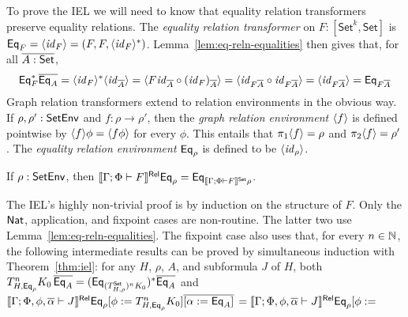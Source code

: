\documentclass[runningheads]{llncs}
\newcommand{\set}{\mathsf{Set}}
\renewcommand{\id}{\mathit{id}}
\renewcommand{\id}{\mathit{id}}
\begin{document}
To prove the IEL we will need to know that equality relation
transformers preserve equality relations. The {\em equality relation
  transformer} on $F : [\set^k,\set]$ is $\Eq_F = \graph{\id_{F}} =
(F, F, \graph{\id_{F}}^*)$. Lemma~\ref{lem:eq-reln-equalities} then
gives that, for all $\ol{A : \set}$,
\begin{equation*}\label{eq:eq-pres-eq}
\Eq^*_F \ol{\Eq_A}
= \graph{\id_F}^* \graph{\id_{\ol{A}}}
= \graph{F \id_{\ol{A}} \circ (\id_F)_{\ol{A}}}
= \graph{\id_{F\ol{A}} \circ \id_{F\ol{A}}}
= \graph{\id_{F\ol{A}}}
= \Eq_{F\ol{A}}
\end{equation*}
Graph relation transformers extend to relation environments in the
obvious way. If $\rho, \rho' : \mathsf{SetEnv}$ and $f : \rho \to \rho'$, then
the {\em graph relation environment} $\langle {f} \rangle$ is defined pointwise
by $\langle {f} \rangle \phi = \langle {f \phi} \rangle$ for every $\phi$. This entails
that $\pi_1 \langle {f} \rangle = \rho$ and $\pi_2 \langle {f} \rangle = \rho'$.  The {\em
  equality relation environment} $\mathsf{Eq}_\rho$ is defined to be
$\graph{\id_{\rho}}$.
%
\begin{theorem}[IEL]\label{thm:iel}
    If $\rho : \mathsf{SetEnv}$, then
  $\relsem{\Gamma; \Phi \vdash F} \Eq_\rho = \Eq_{\setsem{\Gamma;
      \Phi \vdash F}\rho}$.
\end{theorem}
The IEL's highly non-trivial proof is by induction on the
structure of $F$. Only the $\mathsf{Nat}$, application, and fixpoint cases are
non-routine. The latter two use
Lemma~\ref{lem:eq-reln-equalities}. The fixpoint case also uses that,
for every $n \in \mathbb{N}$, the following intermediate results can be
proved by simultaneous induction with Theorem~\ref{thm:iel}: for any
$H$, $\rho$, $A$, and subformula $J$ of $H$, both
$T^n_{H,\Eq_{\rho}} K_0\, \ol{\Eq_A}
= (\Eq_{(T^\set_{H,\rho})^n K_0})^*
\ol{\Eq_A}$\;
and 
$ \llbracket{\Gamma; \Phi, \phi, \overline{\alpha} \vdash J}\rrbracket^{\mathsf{Rel}} \mathsf{Eq}_{\rho} [\phi
  := T^{n}_{H,\mathsf{Eq}_{\rho}} K_0] \overline{[\alpha := \mathsf{Eq}_A]}$ $=
\llbracket{\Gamma; \Phi, \phi, \overline{\alpha} \vdash J}\rrbracket^{\mathsf{Rel}} \mathsf{Eq}_{\rho}[\phi :=$
\end{document}
